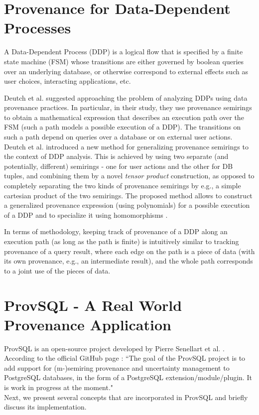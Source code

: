\section{Provenance for Data-Dependent Processes}
A Data-Dependent Process (DDP) is a logical flow that is specified by a finite state machine (FSM) whose transitions are either governed by boolean queries over an underlying database, or otherwise correspond to external effects such as user choices, interacting applications, etc.
\par Deutch et al. \cite{Deutch_DDP} suggested approaching the problem of analyzing DDPs using data provenance practices. In particular, in their study, they use provenance semirings \cite{green2007provenance} to obtain a mathematical expression that describes an execution path over the FSM (such a path models a possible execution of a DDP). The transitions on such a path depend on queries over a database or on external user actions. Deutch et al. introduced a new method for generalizing provenance semirings to the context of DDP analysis. This is achieved by using two separate (and potentially, different) semirings - one for user actions and the other for DB tuples, and combining them by a novel \textit{tensor product} construction, as opposed to completely separating the two kinds of provenance semirings by e.g., a simple cartesian product of the two semirings. The proposed method allows to construct a generalized provenance expression (using polynomials) for a possible execution of a DDP and to specialize it using homomorphisms \cite{green2007provenance}.
\par In terms of methodology, keeping track of provenance of a DDP along an execution path (as long as the path is finite) is intuitively similar to tracking provenance of a query result, where each edge on the path is a piece of data (with its own provenance, e.g., an intermediate result), and the whole path corresponds to a joint use of the pieces of data.


\section{ProvSQL - A Real World Provenance Application}\label{sec:provsql}
ProvSQL is an open-source project developed by Pierre Senellart et al. \cite{Senellart2018}.
According to the official GitHub page \cite{provsql_github}:
``The goal of the ProvSQL project is to add support for (m-)semiring provenance and uncertainty management to PostgreSQL databases, in the form of a PostgreSQL extension/module/plugin. It is work in progress at the moment." \\
Next, we present several concepts that are incorporated in ProvSQL and briefly discuss its implementation.
